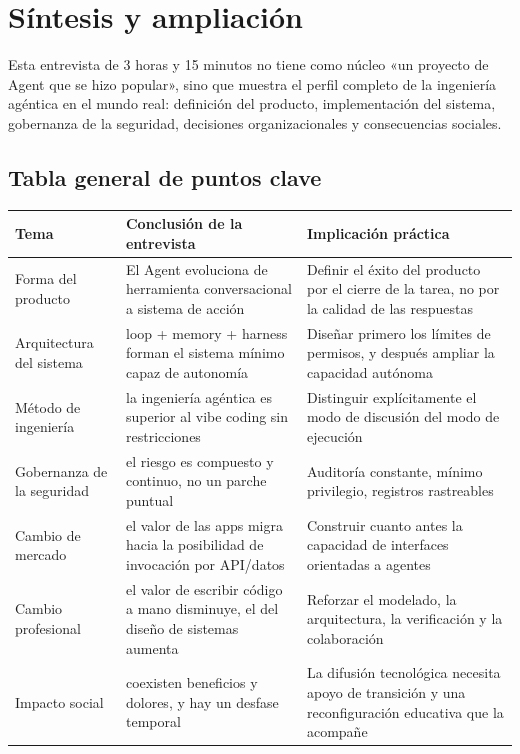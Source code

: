 \section{Síntesis y ampliación}

Esta entrevista de 3 horas y 15 minutos no tiene como núcleo «un proyecto de Agent que se hizo popular», sino que muestra el perfil completo de la ingeniería agéntica en el mundo real: definición del producto, implementación del sistema, gobernanza de la seguridad, decisiones organizacionales y consecuencias sociales.

\subsection{Tabla general de puntos clave}
\begin{longtable}{p{}p{}p{}}
\toprule
\textbf{Tema} & \textbf{Conclusión de la entrevista} & \textbf{Implicación práctica} \\
\midrule
Forma del producto & El Agent evoluciona de herramienta conversacional a sistema de acción & Definir el éxito del producto por el cierre de la tarea, no por la calidad de las respuestas \\
\midrule
Arquitectura del sistema & loop + memory + harness forman el sistema mínimo capaz de autonomía & Diseñar primero los límites de permisos, y después ampliar la capacidad autónoma \\
\midrule
Método de ingeniería & la ingeniería agéntica es superior al vibe coding sin restricciones & Distinguir explícitamente el modo de discusión del modo de ejecución \\
\midrule
Gobernanza de la seguridad & el riesgo es compuesto y continuo, no un parche puntual & Auditoría constante, mínimo privilegio, registros rastreables \\
\midrule
Cambio de mercado & el valor de las apps migra hacia la posibilidad de invocación por API/datos & Construir cuanto antes la capacidad de interfaces orientadas a agentes \\
\midrule
Cambio profesional & el valor de escribir código a mano disminuye, el del diseño de sistemas aumenta & Reforzar el modelado, la arquitectura, la verificación y la colaboración \\
\midrule
Impacto social & coexisten beneficios y dolores, y hay un desfase temporal & La difusión tecnológica necesita apoyo de transición y una reconfiguración educativa que la acompañe \\
\bottomrule
\end{longtable}

